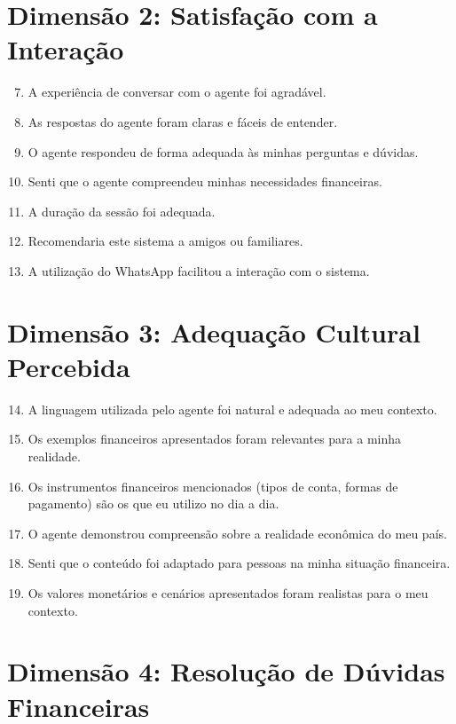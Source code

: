 \section*{Dimensão 2: Satisfação com a Interação}

\begin{enumerate}
\setcounter{enumi}{6}
    \item A experiência de conversar com o agente foi agradável.
    \item As respostas do agente foram claras e fáceis de entender.
    \item O agente respondeu de forma adequada às minhas perguntas e dúvidas.
    \item Senti que o agente compreendeu minhas necessidades financeiras.
    \item A duração da sessão foi adequada.
    \item Recomendaria este sistema a amigos ou familiares.
    \item A utilização do WhatsApp facilitou a interação com o sistema.
\end{enumerate}

\section*{Dimensão 3: Adequação Cultural Percebida}

\begin{enumerate}
\setcounter{enumi}{13}
    \item A linguagem utilizada pelo agente foi natural e adequada ao meu contexto.
    \item Os exemplos financeiros apresentados foram relevantes para a minha realidade.
    \item Os instrumentos financeiros mencionados (tipos de conta, formas de pagamento) são os que eu utilizo no dia a dia.
    \item O agente demonstrou compreensão sobre a realidade econômica do meu país.
    \item Senti que o conteúdo foi adaptado para pessoas na minha situação financeira.
    \item Os valores monetários e cenários apresentados foram realistas para o meu contexto.
\end{enumerate}

\section*{Dimensão 4: Resolução de Dúvidas Financeiras}

